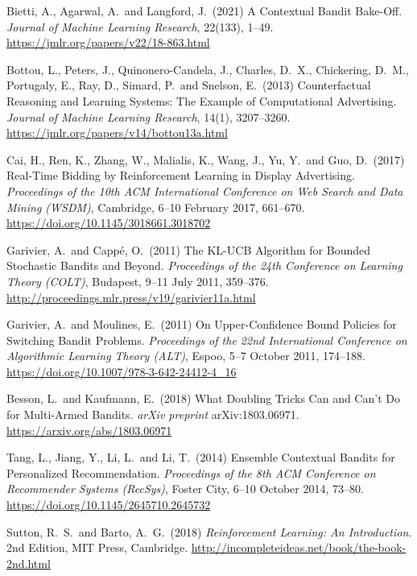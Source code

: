 \begin{enumerate}[label={[\arabic*]},
                  leftmargin=2.8em,
                  labelwidth=2.4em,
                  labelsep=0.4em,
                  itemsep=6pt,
                  align=left]
\item Bietti, A., Agarwal, A.\ and Langford, J.\ (2021) A Contextual Bandit Bake-Off. \textit{Journal of Machine Learning Research}, 22(133), 1--49. \url{https://jmlr.org/papers/v22/18-863.html}

\item Bottou, L., Peters, J., Quinonero-Candela, J., Charles, D.~X., Chickering, D.~M., Portugaly, E., Ray, D., Simard, P.\ and Snelson, E.\ (2013) Counterfactual Reasoning and Learning Systems: The Example of Computational Advertising. \textit{Journal of Machine Learning Research}, 14(1), 3207--3260. \url{https://jmlr.org/papers/v14/bottou13a.html}

\item Cai, H., Ren, K., Zhang, W., Malialis, K., Wang, J., Yu, Y.\ and Guo, D.\ (2017) Real-Time Bidding by Reinforcement Learning in Display Advertising. \textit{Proceedings of the 10th ACM International Conference on Web Search and Data Mining (WSDM)}, Cambridge, 6--10 February 2017, 661--670. \url{https://doi.org/10.1145/3018661.3018702}

\item Garivier, A.\ and Capp\'e, O.\ (2011) The KL-UCB Algorithm for Bounded Stochastic Bandits and Beyond. \textit{Proceedings of the 24th Conference on Learning Theory (COLT)}, Budapest, 9--11 July 2011, 359--376. \url{http://proceedings.mlr.press/v19/garivier11a.html}

\item Garivier, A.\ and Moulines, E.\ (2011) On Upper-Confidence Bound Policies for Switching Bandit Problems. \textit{Proceedings of the 22nd International Conference on Algorithmic Learning Theory (ALT)}, Espoo, 5--7 October 2011, 174--188. \url{https://doi.org/10.1007/978-3-642-24412-4_16}

\item Besson, L.\ and Kaufmann, E.\ (2018) What Doubling Tricks Can and Can't Do for Multi-Armed Bandits. \textit{arXiv preprint} arXiv:1803.06971. \url{https://arxiv.org/abs/1803.06971}

\item Tang, L., Jiang, Y., Li, L.\ and Li, T.\ (2014) Ensemble Contextual Bandits for Personalized Recommendation. \textit{Proceedings of the 8th ACM Conference on Recommender Systems (RecSys)}, Foster City, 6--10 October 2014, 73--80. \url{https://doi.org/10.1145/2645710.2645732}

\item Sutton, R.~S.\ and Barto, A.~G.\ (2018) \textit{Reinforcement Learning: An Introduction}. 2nd Edition, MIT Press, Cambridge. \url{http://incompleteideas.net/book/the-book-2nd.html}


\end{enumerate}
